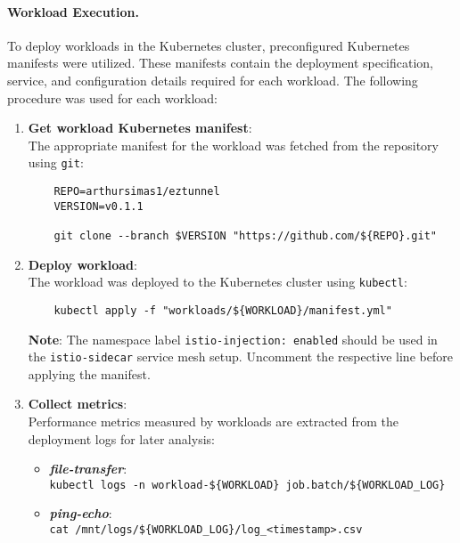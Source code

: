 \paragraph{Workload Execution.} To deploy workloads in the Kubernetes cluster, preconfigured Kubernetes manifests were utilized. These manifests contain the deployment specification, service, and configuration details required for each workload. The following procedure was used for each workload:

\begin{enumerate}
    \item \textbf{Get workload Kubernetes manifest}:\\
    The appropriate manifest for the workload was fetched from the repository using \texttt{git}:
    \begin{verbatim}
    REPO=arthursimas1/eztunnel
    VERSION=v0.1.1

    git clone --branch $VERSION "https://github.com/${REPO}.git"
    \end{verbatim}

    \item \textbf{Deploy workload}:\\
    The workload was deployed to the Kubernetes cluster using \texttt{kubectl}:

    \begin{verbatim}
    kubectl apply -f "workloads/${WORKLOAD}/manifest.yml"
    \end{verbatim}

    \textbf{Note}: The namespace label \verb!istio-injection: enabled! should be used in the  \texttt{istio-sidecar} service mesh setup. Uncomment the respective line before applying the manifest.

    \item \textbf{Collect metrics}:\\
    Performance metrics measured by workloads are extracted from the deployment logs for later analysis:

    \begin{itemize}
        \item \textbf{\textit{file-transfer}}:\\
        \verb!kubectl logs -n workload-${WORKLOAD} job.batch/${WORKLOAD_LOG}!

        \item \textbf{\textit{ping-echo}}:\\
        \verb!cat /mnt/logs/${WORKLOAD_LOG}/log_<timestamp>.csv!


\end{itemize}
\end{enumerate}
